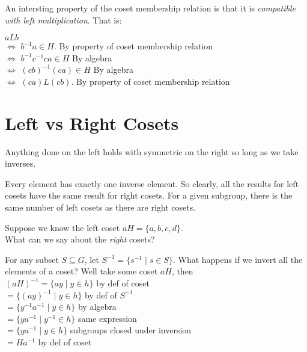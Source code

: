\frmrule

An intersting property of the coset membership relation is that it is 
\textit{compatible with left multiplication}. That is:



$aLb$  \\
$\Leftrightarrow$ $b^{-1}a \in H$. By property of coset membership relation\\
$\Leftrightarrow$ $b^{-1}c^{-1}ca \in H$ By algebra \\
$\Leftrightarrow$ $(cb)^{-1}(ca) \in H$ By algebra \\
$\Leftrightarrow$ $(ca)L(cb)$. By property of coset membership relation\\


\section{Left vs Right Cosets}



Anything done on the left holds with symmetric on the right 
so long as we take inverses. 

Every element has exactly one inverse element. 
So clearly, all the results for left cosets have the same result 
for right cosets. For a given subgroup, there is the same 
number of left cosets as there are right cosets. 

\frmrule

\begin{example}
Suppose we know the left coset $aH = \{a,b,c,d\}$. \\
What can we say about the \textit{right} cosets?
\end{example}

\frmrule

For any subset $S \subseteq G$, let $S^{-1} = \{ s^{-1} \;|\; s \in S\}$. 
What happens if we invert all the elements of a coset? 
Well take some coset $aH$, then \\
$(aH)^{-1} = \{ay \;|\; y \in h\}$ by def of coset \\
$= \{(ay)^{-1} \;|\; y \in h\}$ by def of $S^{-1}$\\
$= \{y^{-1}a^{-1} \;|\; y \in h\}$ by algebra\\
$= \{y a^{-1} \;|\; y^{-1} \in h\}$ same expression\\
$= \{y a^{-1} \;|\; y \in h\}$ subgroups closed under inversion\\
$= Ha^{-1}$  by def of coset\\

